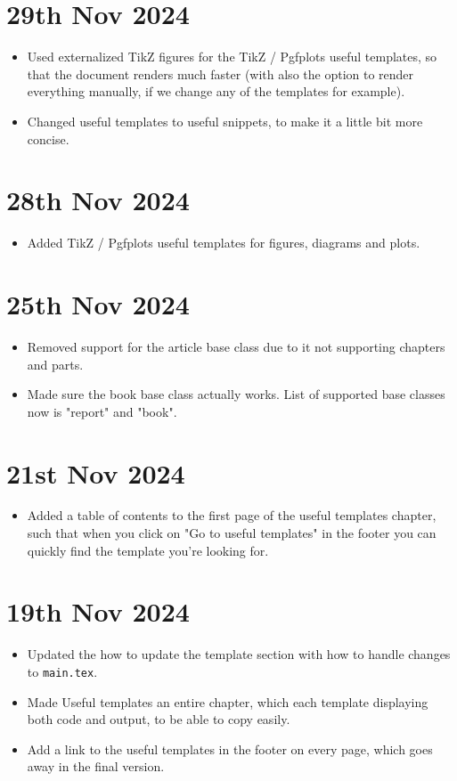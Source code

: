 \section*{29th Nov 2024} \label{sec:changelog:2024/11/29}
\begin{itemize}
    \item Used externalized TikZ figures for the TikZ / Pgfplots useful templates, so that the document renders much faster (with also the option to render everything manually, if we change any of the templates for example).
    \item Changed useful templates to useful snippets, to make it a little bit more concise.
\end{itemize}

\section*{28th Nov 2024} \label{sec:changelog:2024/11/28}
\begin{itemize}
    \item Added TikZ / Pgfplots useful templates for figures, diagrams and plots.
\end{itemize}

\section*{25th Nov 2024} \label{sec:changelog:2024/11/25}
\begin{itemize}
    \item Removed support for the article base class due to it not supporting chapters and parts.
    \item Made sure the book base class actually works. List of supported base classes now is "report" and "book".
\end{itemize}

\section*{21st Nov 2024} \label{sec:changelog:2024/11/21}
\begin{itemize}
    \item Added a table of contents to the first page of the useful templates chapter, such that when you click on "Go to useful templates" in the footer you can quickly find the template you're looking for.
\end{itemize}

\section*{19th Nov 2024} \label{sec:changelog:2024/11/19}
\begin{itemize}
    \item Updated the how to update the template section with how to handle changes to \verb|main.tex|.
    \item Made Useful templates an entire chapter, which each template displaying both code and output, to be able to copy easily.
    \item Add a link to the useful templates in the footer on every page, which goes away in the final version.
\end{itemize}


